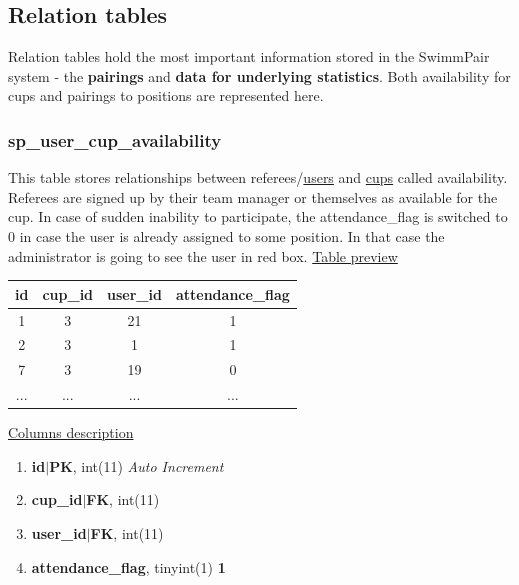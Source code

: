 \subsection{Relation tables}
Relation tables hold the most important information stored in the SwimmPair system - the \textbf{pairings} and \textbf{data for underlying statistics}. Both availability for cups and pairings to positions are represented here.
\subsubsection*{sp\_user\_cup\_availability}
This table stores relationships between referees/\underline{users} and \underline{cups} called availability. Referees are signed up by their team manager or themselves as available for the cup. In case of sudden inability to participate, the attendance\_flag is switched to 0 in case the user is already assigned to some position. In that case the administrator is going to see the user in red box.
\newline
\underline{Table preview}
\begin{center}
 \begin{tabular}{||c c c c||} 
 \hline
 id & cup\_id & user\_id & attendance\_flag  \\ [0.5ex] 
 \hline\hline
 1 & 3 & 21 & 1 \\ 
 \hline
 2 & 3 & 1 & 1 \\ 
 \hline
 7 & 3 & 19 & 0 \\ 
 \hline
 ... & ... & ... & ...  \\ [0.5ex] 
 \hline
\end{tabular}
\end{center}
\underline{Columns description}
\begin{enumerate}
  \setlength\itemsep{0em}
  \item \textbf{id$|$PK}, int(11) \textit{Auto Increment}
  \item \textbf{cup\_id$|$FK}, int(11)
  \item \textbf{user\_id$|$FK}, int(11)
  \item \textbf{attendance\_flag}, tinyint(1) \lbrack \textbf{\textbf{1}}\rbrack 
\end{enumerate}

